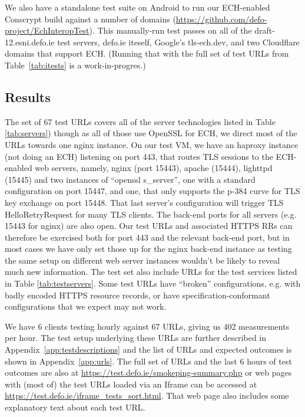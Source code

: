 We also have a standalone test suite on Android to run our ECH-enabled
Conscrypt build against a number of domains
(\url{https://github.com/defo-project/EchInteropTest}).  This manually-run test
passes on all of the draft-12.esni.defo.ie test servers, defo.ie iteself,
Google's tls-ech.dev, and two Cloudflare domains that support ECH. (Running
that with the full set of test URLs from Table~\ref{tab:itests} is a
work-in-progres.)

\subsection{Results}

The set of 67 test URLs covers all of the server technologies listed in Table
\ref{tab:servers}) though as all of those use OpenSSL for ECH, we direct most
of the URLs towards one nginx instance. On our test VM, we have an haproxy
instance (not doing an ECH) listening on port 443, that routes TLS sessions to
the ECH-enabled web servers, namely, nginx (port 15443), apache (15444),
lighttpd (15445) and two instances of ``openssl s\_server'', one with a
standard configuration on port 15447, and one, that only supports the p-384
curve for TLS key exchange on port 15448. That last server's configuration will
trigger TLS HelloRetryRequest for many TLS clients. The back-end ports for all
servers (e.g. 15443 for nginx) are also open. Our test URLs and associated
HTTPS RRs can therefore be exercised both for port 443 and the relevant
back-end port, but in most cases we have only set those up for the nginx
back-end instance as testing the same setup on different web server instances
wouldn't be likely to reveal much new information.  The test set also include
URLs for the test services listed in Table \ref{tab:testservers}.  Some test
URLs have ``broken'' configurations, e.g. with badly encoded HTTPS resource
records, or have specification-conformant configurations that we expect may not
work.

We have 6 clients testing hourly against 67 URLs, giving us 402 measurements
per hour. The test setup underlying these URLs are further described in
Appendix~\ref{app:testdescriptions} and the list of URLs and expected outcomes
is shown in Appendix~\ref{app:urls}.  The full set of URLs and the last 6 hours
of test outcomes are also at \url{https://test.defo.ie/smokeping-summary.php}
or web pages with (most of) the test URLs loaded via an Iframe can be accessed
at \url{https://test.defo.ie/iframe_tests_sort.html}. That web page also
includes some explanatory text about each test URL.

